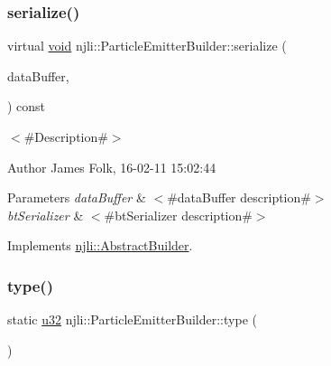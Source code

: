 \subsubsection{\texorpdfstring{serialize()}{serialize()}}
{\footnotesize\ttfamily virtual \mbox{\hyperlink{_thread_8h_af1e856da2e658414cb2456cb6f7ebc66}{void}} njli\+::\+Particle\+Emitter\+Builder\+::serialize (\begin{DoxyParamCaption}\item[{\mbox{\hyperlink{_thread_8h_af1e856da2e658414cb2456cb6f7ebc66}{void}} $\ast$}]{data\+Buffer,  }\item[{bt\+Serializer $\ast$}]{ }\end{DoxyParamCaption}) const\hspace{0.3cm}{\ttfamily [virtual]}}



$<$\#\+Description\#$>$ 

\begin{DoxyAuthor}{Author}
James Folk, 16-\/02-\/11 15\+:02\+:44
\end{DoxyAuthor}

\begin{DoxyParams}{Parameters}
{\em data\+Buffer} & $<$\#data\+Buffer description\#$>$ \\
\hline
{\em bt\+Serializer} & $<$\#bt\+Serializer description\#$>$ \\
\hline
\end{DoxyParams}


Implements \mbox{\hyperlink{classnjli_1_1_abstract_builder_ab66b774e02ccb9da554c9aab7fa6d981}{njli\+::\+Abstract\+Builder}}.

\mbox{\label{classnjli_1_1_particle_emitter_builder_a82aaac8c009b5310435c014aa26a0afc}} 
\subsubsection{\texorpdfstring{type()}{type()}}
{\footnotesize\ttfamily static \mbox{\hyperlink{_util_8h_a10e94b422ef0c20dcdec20d31a1f5049}{u32}} njli\+::\+Particle\+Emitter\+Builder\+::type (\begin{DoxyParamCaption}{ }\end{DoxyParamCaption})\hspace{0.3cm}{\ttfamily [static]}}

